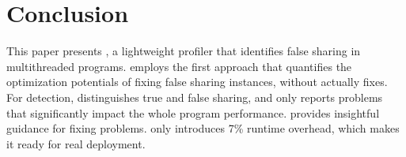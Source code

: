 \section{Conclusion}
\label{sec:conclusion}

This paper presents \cheetah{}, a lightweight profiler that identifies false sharing in multithreaded programs. \cheetah{} employs the first approach that quantifies the optimization potentials of fixing false sharing instances, without actually fixes. For detection, \cheetah{} distinguishes true and false sharing, and only reports problems that significantly impact the whole program performance. \cheetah{} provides insightful guidance for fixing problems. \Cheetah{} only introduces 7\% runtime overhead, which makes it ready for real deployment. 


